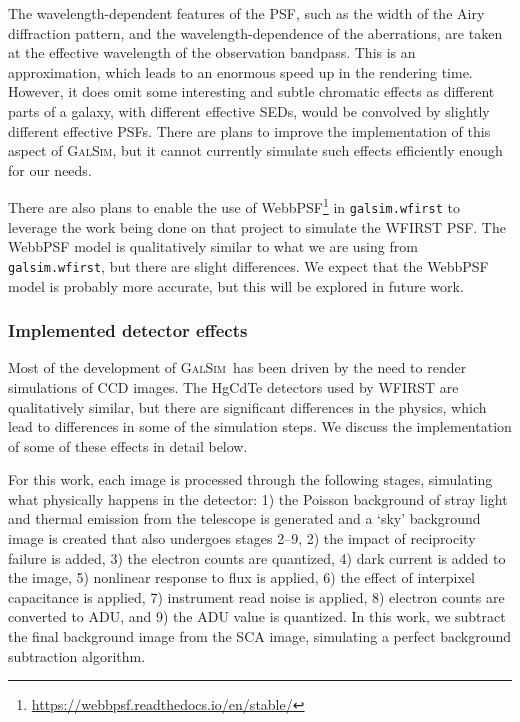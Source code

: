 \documentclass[usenatbib]{mnras}
\newcommand{\galsim}{\textsc{GalSim}}
\begin{document}
The wavelength-dependent features of the PSF, such as the width of the Airy diffraction pattern, and the wavelength-dependence of the aberrations, are taken at the effective wavelength of the observation bandpass.
This is an approximation, which leads to an enormous speed up in the rendering time.
However, it does omit some interesting and subtle chromatic effects as different parts of a galaxy, with different effective SEDs, would be convolved by slightly different effective PSFs.
There are plans to improve the implementation of this aspect of \galsim, but it cannot currently simulate such effects efficiently enough for our needs.

There are also plans to enable the use of WebbPSF\footnote{\url{https://webbpsf.readthedocs.io/en/stable/}} in \texttt{galsim.wfirst} to leverage the work being done on that project to simulate the WFIRST PSF.
The WebbPSF model is qualitatively similar to what we are using from \texttt{galsim.wfirst}, but there are slight differences.
We expect that the WebbPSF model is probably more accurate, but this will be explored in future work.

\subsubsection{Implemented detector effects}\label{effects}

Most of the development of \galsim\ has been driven by the need to render simulations of CCD images.
The HgCdTe detectors used by WFIRST are qualitatively similar, but there are significant differences in the physics, which lead to differences in some of the simulation steps. We discuss the implementation of some of these effects in detail below. 

For this work, each image is processed through the following stages, simulating what physically happens in the detector: 1) the Poisson background of stray light and thermal emission from the telescope is generated and a `sky' background image is created that also undergoes stages 2--9, 2) the impact of reciprocity failure is added, 3) the electron counts are quantized, 4) dark current is added to the image, 5) nonlinear response to flux is applied, 6) the effect of interpixel capacitance is applied, 7) instrument read noise is applied, 8) electron counts are converted to ADU, and 9) the ADU value is quantized. In this work, we subtract the final background image from the SCA image, simulating a perfect background subtraction algorithm.
\end{document}
